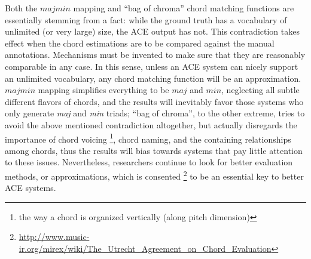 Both the $majmin$ mapping and ``bag of chroma'' chord matching functions are essentially stemming from a fact: while the ground truth has a vocabulary of unlimited (or very large) size, the ACE output has not. This contradiction takes effect when the chord estimations are to be compared against the manual annotations. Mechanisms must be invented to make sure that they are reasonably comparable in any case. In this sense, unless an ACE system can nicely support an unlimited vocabulary, any chord matching function will be an approximation. $majmin$ mapping simplifies everything to be $maj$ and $min$, neglecting all subtle different flavors of chords, and the results will inevitably favor those systems who only generate \textit{maj} and \textit{min} triads; ``bag of chroma'', to the other extreme, tries to avoid the above mentioned contradiction altogether, but actually disregards the importance of chord voicing \footnote{the way a chord is organized vertically (along pitch dimension)}, chord naming, and the containing relationships among chords, thus the results will bias towards systems that pay little attention to these issues. Nevertheless, researchers continue to look for better evaluation methods, or approximations, which is consented \footnote{\url{http://www.music-ir.org/mirex/wiki/The\_Utrecht\_Agreement\_on\_Chord\_Evaluation}} to be an essential key to better ACE systems.

